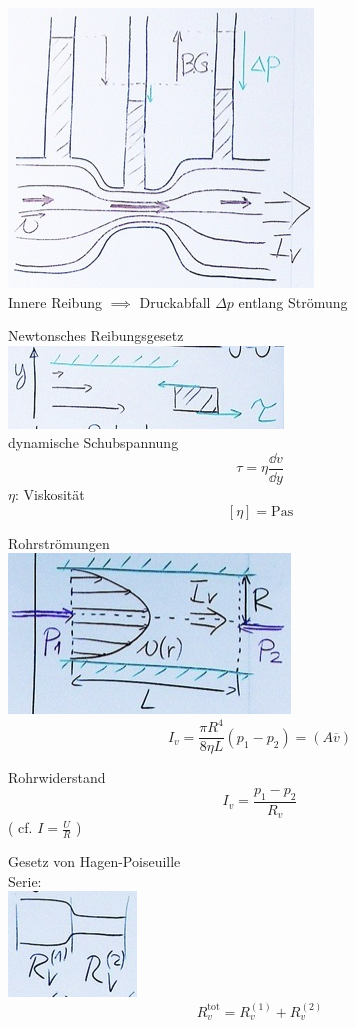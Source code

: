 \begin{rep*}[ note = Hydrodynamik ]
	\includegraphics{Bild95} \\
	Innere Reibung $\implies$ Druckabfall $\Delta p$ entlang Strömung
	
	Newtonsches Reibungsgesetz \\
	\includegraphics{Bild96} \\
	dynamische Schubspannung
	\[ \tau = \eta \frac{\dd v}{\dd y} \]
	$\eta$: Viskosität
	\[ [ \eta ] = \si{\pascal\second} \]
	
	Rohrströmungen \\
	\includegraphics{Bild97}
	\[ I_v = \frac{\pi R^4}{8 \eta L} ( p_1 - p_2 ) = ( A \overline{v} ) \]
	
	Rohrwiderstand
	\[ I_v = \frac{p_1 - p_2}{R_v} \]
	( cf. $I = \frac{U}{R}$ )
	
	Gesetz von Hagen-Poiseuille \\
	Serie: \\
	\includegraphics{Bild98}
	\[ R_v^{\text{tot}} = R_v^{(1)} + R_v^{(2)} \]
\end{rep*}

